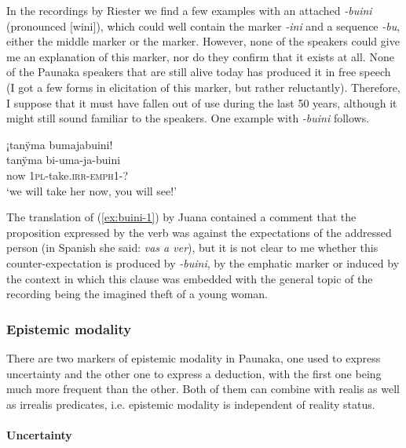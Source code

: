 In the recordings by Riester we find a few examples with an attached \textit{-buini} (pronounced [wini]), which could well contain the  marker \textit{-ini} and a sequence \textit{-bu}, either the middle marker or the  marker. However, none of the speakers could give me an explanation of this marker, nor do they confirm that it exists at all. None of the Paunaka speakers that are still alive today has produced it in free speech (I got a few forms in elicitation of this marker, but rather reluctantly). Therefore, I suppose that it must have fallen out of use during the last 50 years, although it might still sound familiar to the speakers. One example with \textit{-buini} follows.

\ea\label{ex:buini-1}
\begingl 
\glpreamble ¡tanÿma bumajabuini!\\
\gla tanÿma bi-uma-ja-buini\\ 
\glb now 1\textsc{pl}-take.\textsc{irr}-\textsc{emph}1-?\\ 
\glft ‘we will take her now, you will see!’\\ 
\endgl
\trailingcitation{[nxx-a630101g-3.048]}
\xe

The translation of (\ref{ex:buini-1}) by Juana contained a comment that the proposition expressed by the verb was against the expectations of the addressed person (in Spanish she said: \textit{vas a ver}), but it is not clear to me whether this counter-ex\-pec\-ta\-tion is produced by \textit{-buini}, by the emphatic marker or induced by the context in which this clause was embedded with the general topic of the recording being the imagined theft of a young woman.

\subsubsection{Epistemic modality}\label{sec:Epistemic_Mod}

There are two markers of epistemic modality in Paunaka, one used to express uncertainty and the other one to express a deduction, with the first one being much more frequent than the other. Both of them can combine with realis as well as irrealis predicates, i.e. epistemic modality is independent of reality status.

\paragraph{Uncertainty}\label{sec:ModalityUncertainty}

